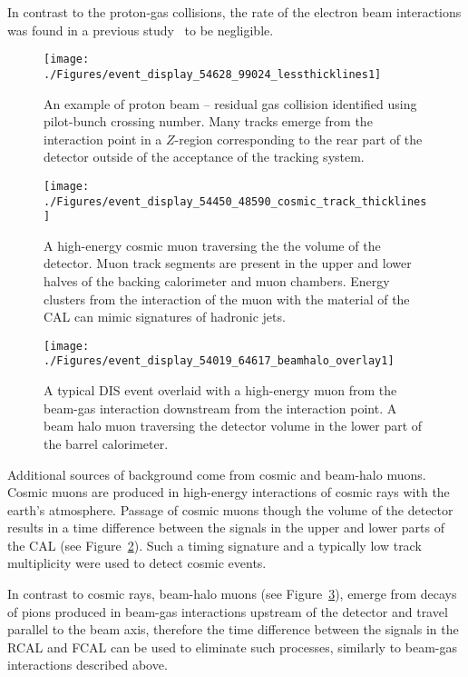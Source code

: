 In contrast to the proton-gas collisions, the rate of the electron beam interactions was found in a previous study~\cite{thesis:moritz:2001} to be negligible.

\begin{figure}[ht]
	\centering
	\texttt{[image: ./Figures/event\_display\_54628\_99024\_lessthicklines1]} 
	\caption{An example of proton beam -- residual gas collision identified using pilot-bunch crossing number. Many tracks emerge from the interaction point in a $Z$-region corresponding to the rear part of the \zeus detector outside of the acceptance of the tracking system.}
	\label{fig:beamgaseventdisplay}
\end{figure}

\begin{figure}[htbp]
	\centering
	\texttt{[image: ./Figures/event\_display\_54450\_48590\_cosmic\_track\_thicklines]} 
	\caption{A high-energy cosmic muon traversing the the volume of the \zeus detector. Muon track segments are present in the upper and lower halves of the backing calorimeter and muon chambers. Energy clusters from the interaction of the muon with the material of the CAL can mimic signatures of hadronic jets.}
	\label{fig:cosmiceventdisplay}
\end{figure}


\begin{figure}[htbp!]
	\centering
	\texttt{[image: ./Figures/event\_display\_54019\_64617\_beamhalo\_overlay1]} 
	\caption{A typical DIS event overlaid with a high-energy muon from the beam-gas interaction downstream from the interaction point. A beam halo muon traversing the detector volume in the lower part of the barrel calorimeter.}
	\label{fig:beamhaloeventdisplay}
\end{figure}

Additional sources of background come from cosmic and beam-halo muons. Cosmic muons are produced in high-energy interactions of cosmic rays with the earth's atmosphere. Passage of cosmic muons though the volume of the detector results in a time difference between the signals in the upper and lower parts of the CAL (see Figure~\ref{fig:cosmiceventdisplay}). Such a timing signature and a typically low track multiplicity were used to detect cosmic events. 

In contrast to cosmic rays, beam-halo muons (see Figure~\ref{fig:beamhaloeventdisplay}), emerge from decays of pions produced in beam-gas interactions upstream of the detector and travel parallel to the beam axis, therefore the time difference between the signals in the RCAL and FCAL can be used to eliminate such processes, similarly to beam-gas interactions described above. 

